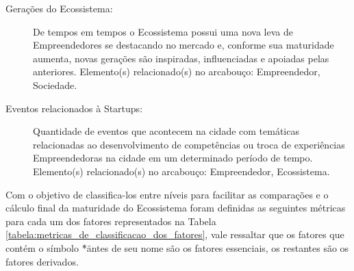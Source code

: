 \begin{description}
  \item [Gerações do Ecossistema:] De tempos em tempos o Ecossistema possui uma nova leva de Empreendedores se destacando no mercado e, conforme sua maturidade aumenta, novas gerações são inspiradas, influenciadas e apoiadas pelas anteriores. Elemento(s) relacionado(s) no arcabouço: Empreendedor, Sociedade.  

  \item [Eventos relacionados à Startups:] Quantidade de eventos que acontecem na cidade com temáticas relacionadas ao desenvolvimento de competências ou troca de experiências Empreendedoras na cidade em um determinado período de tempo. Elemento(s) relacionado(s) no arcabouço: Empreendedor, Ecossistema.     
\end{description}

Com o objetivo de classifica-los entre níveis para facilitar as comparações e o cálculo final da maturidade do Ecossistema foram definidas as seguintes métricas para cada um dos fatores representados na Tabela \ref{tabela:metricas_de_classificacao_dos_fatores}, vale ressaltar que os fatores que contém o símbolo \"*\" antes de seu nome são os fatores essenciais, os restantes são os fatores derivados.


